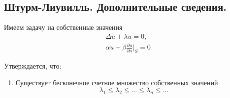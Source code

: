 \subsection{Штурм-Лиувилль. Дополнительные сведения.}

Имеем задачу на собственные значения 
\begin{align*}
	\Delta u + \lambda u = 0, \\
	\alpha u + \beta \frac{\partial u}{\partial n} \Big|_{S} = 0
\end{align*}

Утверждается, что:
\begin{enumerate}
	\item Существует бесконечное счетное множество собственных значений
	\begin{equation}
		\lambda_1 \leqslant \lambda_2 \leqslant \dotsc \leqslant \lambda_n \leqslant \dotsc
	\end{equation}
	
	
\end{enumerate}
